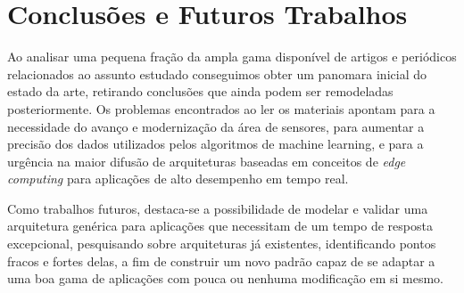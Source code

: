 \documentclass[12pt]{article}
\begin{document}
\section{Conclusões e Futuros Trabalhos}

Ao analisar uma pequena fração da ampla gama disponível de artigos e periódicos relacionados ao assunto estudado conseguimos obter um panomara inicial do estado da arte, retirando conclusões que ainda podem ser remodeladas posteriormente. Os problemas encontrados ao ler os materiais apontam para a necessidade do avanço e modernização da área de sensores, para aumentar a precisão dos dados utilizados pelos algoritmos de machine learning, e para a urgência na maior difusão de arquiteturas baseadas em conceitos de \emph{edge computing} para aplicações de alto desempenho em tempo real.

Como trabalhos futuros, destaca-se a possibilidade de modelar e validar uma arquitetura genérica para aplicações que necessitam de um tempo de resposta excepcional, pesquisando sobre arquiteturas já existentes, identificando pontos fracos e fortes delas, a fim de construir um novo padrão capaz de se adaptar a uma boa gama de aplicações com pouca ou nenhuma modificação em si mesmo.

\nocite{*}
\medskip



\end{document}
